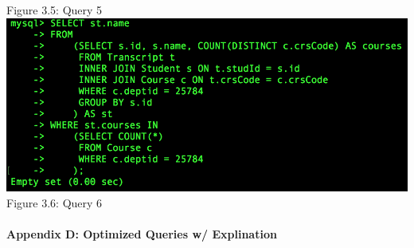 \documentclass[11pt]{report}
\begin{document}
\begin{center}
			Figure 3.5: Query 5\\
			\includegraphics[scale=0.336]{a6.PNG}\\
			Figure 3.6: Query 6\\
		\end{center}
	\paragraph*{Appendix D: Optimized Queries w/ Explination}
\end{document}
